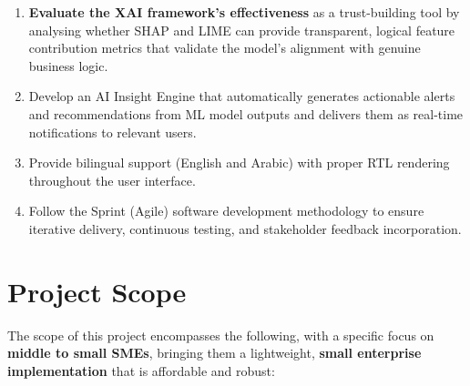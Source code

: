 \documentclass[12pt,a4paper]{report}
\begin{document}
\begin{enumerate}[label=\arabic*.]
  \item \textbf{Evaluate the XAI framework's effectiveness} as a trust-building tool by analysing whether SHAP and LIME can provide transparent, logical feature contribution metrics that validate the model's alignment with genuine business logic.

  \item Develop an AI Insight Engine that automatically generates actionable alerts and recommendations from ML model outputs and delivers them as real-time notifications to relevant users.

  \item Provide bilingual support (English and Arabic) with proper RTL rendering throughout the user interface.

  \item Follow the Sprint (Agile) software development methodology to ensure iterative delivery, continuous testing, and stakeholder feedback incorporation.
\end{enumerate}

\section{Project Scope}
\label{sec:scope}

The scope of this project encompasses the following, with a specific focus on \textbf{middle to small SMEs}, bringing them a lightweight, \textbf{small enterprise implementation} that is affordable and robust:
\end{document}
